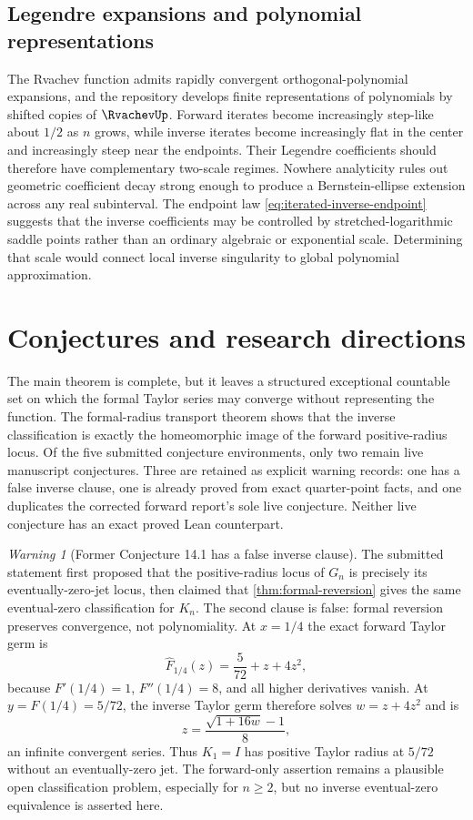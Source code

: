 \documentclass[11pt,oneside]{article}
\theoremstyle{definition}
\theoremstyle{remark}
\newtheorem{warning}[theorem]{Warning}
\begin{document}
\subsection{Legendre expansions and polynomial representations}

The Rvachev function admits rapidly convergent orthogonal-polynomial expansions, and
the repository develops finite representations of polynomials by shifted copies of
$\RvachevUp$.  Forward iterates become increasingly step-like about $1/2$ as $n$ grows, while
inverse iterates become increasingly flat in the center and increasingly steep near the
endpoints.  Their Legendre coefficients should therefore have complementary two-scale
regimes.  Nowhere analyticity rules out geometric coefficient decay strong enough to
produce a Bernstein-ellipse extension across any real subinterval.  The endpoint law
\eqref{eq:iterated-inverse-endpoint} suggests that the inverse coefficients may be
controlled by stretched-logarithmic saddle points rather than an ordinary algebraic or
exponential scale.  Determining that scale would connect local inverse singularity to
global polynomial approximation.

\section{Conjectures and research directions}
\label{sec:future}

The main theorem is complete, but it leaves a structured exceptional countable set on
which the formal Taylor series may converge without representing the function.  The
formal-radius transport theorem shows that the inverse classification is exactly the
homeomorphic image of the forward positive-radius locus.  Of the five submitted
conjecture environments, only two remain live manuscript conjectures.  Three are
retained as explicit warning records: one has a false inverse clause, one is already
proved from exact quarter-point facts, and one duplicates the corrected forward
report's sole live conjecture.  Neither live conjecture has an exact proved Lean
counterpart.

\begin{warning}[Former Conjecture 14.1 has a false inverse clause]
\label{warn:trichotomy}
The submitted statement first proposed that the positive-radius locus of $G_n$ is
precisely its eventually-zero-jet locus, then claimed that
\cref{thm:formal-reversion} gives the same eventual-zero classification for $K_n$.
The second clause is false: formal reversion preserves convergence, not polynomiality.
At $x=1/4$ the exact forward Taylor germ is
\[
 \widehat F_{1/4}(z)=\frac5{72}+z+4z^2,
\]
because $F'(1/4)=1$, $F''(1/4)=8$, and all higher derivatives vanish.  At
$y=F(1/4)=5/72$, the inverse Taylor germ therefore solves $w=z+4z^2$ and is
\[
 z=\frac{\sqrt{1+16w}-1}{8},
\]
an infinite convergent series.  Thus $K_1=I$ has positive Taylor radius at $5/72$
without an eventually-zero jet.  The forward-only assertion remains a plausible open
classification problem, especially for $n\geq2$, but no inverse eventual-zero
equivalence is asserted here.
\end{warning}
\end{document}

